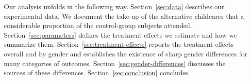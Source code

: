 Our analysis unfolds in the following way. Section~\ref{sec:data} describes our experimental data. We document the take-up of the alternative childcares that a considerable proportion of the control-group subjects attended. Section~\ref{sec:parameters} defines the treatment effects we estimate and how we summarize them. Section~\ref{sec:treatment-effects} reports the treatment effects overall and by gender and establishes the existence of sharp gender differences for many categories of outcomes. Section~\ref{sec:gender-differences} discusses the sources of these differences. Section~\ref{sec:conclusion} concludes.
